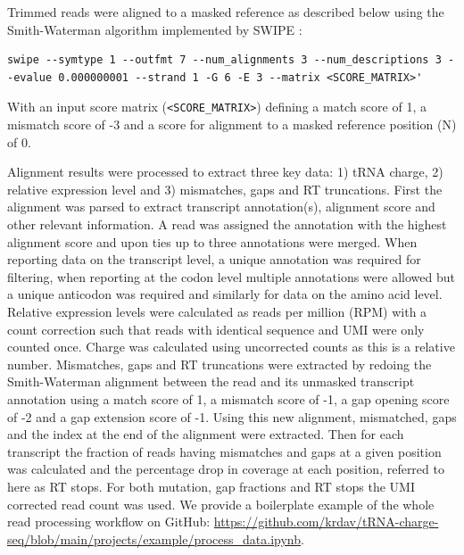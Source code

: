 \documentclass[9pt,lineno]{elife}
\begin{document}
Trimmed reads were aligned to a masked reference as described below using the Smith-Waterman algorithm implemented by SWIPE \citep{Rognes2011-iu}:
\begin{lstlisting}
swipe --symtype 1 --outfmt 7 --num_alignments 3 --num_descriptions 3 --evalue 0.000000001 --strand 1 -G 6 -E 3 --matrix <SCORE_MATRIX>'
\end{lstlisting}
With an input score matrix (\verb|<SCORE_MATRIX>|) defining a match score of 1, a mismatch score of -3 and a score for alignment to a masked reference position (N) of 0.

Alignment results were processed to extract three key data: 1) tRNA charge, 2) relative expression level and 3) mismatches, gaps and RT truncations.
First the alignment was parsed to extract transcript annotation(s), alignment score and other relevant information.
A read was assigned the annotation with the highest alignment score and upon ties up to three annotations were merged.
When reporting data on the transcript level, a unique annotation was required for filtering, when reporting at the codon level multiple annotations were allowed but a unique anticodon was required and similarly for data on the amino acid level.
Relative expression levels were calculated as reads per million (RPM) with a count correction such that reads with identical sequence and UMI were only counted once.
Charge was calculated using uncorrected counts as this is a relative number.
Mismatches, gaps and RT truncations were extracted by redoing the Smith-Waterman alignment between the read and its unmasked transcript annotation using a match score of 1, a mismatch score of -1, a gap opening score of -2 and a gap extension score of -1.
Using this new alignment, mismatched, gaps and the index at the end of the alignment were extracted.
Then for each transcript the fraction of reads having mismatches and gaps at a given position was calculated and the percentage drop in coverage at each position, referred to here as RT stops.
For both mutation, gap fractions and RT stops the UMI corrected read count was used.
We provide a boilerplate example of the whole read processing workflow on GitHub: \url{https://github.com/krdav/tRNA-charge-seq/blob/main/projects/example/process_data.ipynb}.
\end{document}

